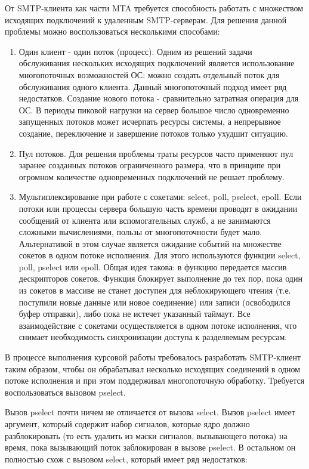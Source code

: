 \documentclass[a4paper,12pt]{report}
\begin{document}
	От SMTP-клиента как части MTA требуется способность работать с множеством исходящих подключений к удаленным SMTP-серверам. Для решения данной проблемы можно воспользоваться несколькими способами:
	\begin{enumerate}
		\item Один клиент - один поток (процесс). Одним из решений задачи обслуживания нескольких исходящих подключений является использование многопоточных возможностей ОС: можно создать отдельный поток для обслуживания одного клиента. Данный многопоточный подход имеет ряд недостатков. Создание нового потока - сравнительно затратная операция для ОС. В периоды пиковой нагрузки на сервер большое число одновременно запущенных потоков может исчерпать ресурсы системы, а непрерывное создание, переключение и завершение потоков только ухудшит ситуацию.
		\item Пул потоков. Для решения проблемы траты ресурсов часто применяют пул заранее созданных потоков ограниченного размера, что в принципе при огромном количестве одновременных подключений не решает проблему.
		\item Мультиплексирование при работе с сокетами: select, poll, pselect, epoll. Если потоки или процессы сервера большую часть времени проводят в ожидании сообщений от клиента или вспомогательных служб, а не занимаются сложными вычислениями, пользы от многопоточности будет мало. Альтернативой в этом случае является ожидание событий на множестве сокетов в одном потоке исполнения. Для этого используются функции select, poll, pselect или epoll. Общая идея такова: в функцию передается массив дескрипторов сокетов. Функция блокирует выполнение до тех пор, пока один из сокетов в массиве не станет доступен для неблокирующего чтения (т.е. поступили новые данные или новое соединение) или записи (освободился буфер отправки), либо пока не истечет указанный таймаут. Все взаимодействие с сокетами осуществляется в одном потоке исполнения, что снимает необходимость синхронизации доступа к разделяемым ресурсам.
	\end{enumerate}

	В процессе выполнения курсовой работы требовалось разработать SMTP-клиент таким образом, чтобы он обрабатывал несколько исходящих соединений в одном потоке исполнения и при этом поддерживал многопоточную обработку. Требуется воспользоваться вызовом pselect.

	Вызов pselect почти ничем не отличается от вызова select. Вызов pselect имеет аргумент, который содержит набор сигналов, которые ядро должно разблокировать (то есть удалить из маски сигналов, вызывающего потока) на время, пока вызывающий поток заблокирован в вызове pselect. В остальном он полностью схож с вызовом select, который имеет ряд недостатков:
\end{document}
